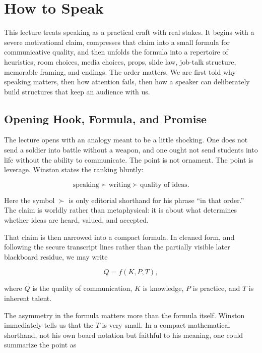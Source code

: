 \chapter{How to Speak}

This lecture treats speaking as a practical craft with real stakes. It begins with a severe motivational claim, compresses that claim into a small formula for communicative quality, and then unfolds the formula into a repertoire of heuristics, room choices, media choices, props, slide law, job-talk structure, memorable framing, and endings. The order matters. We are first told why speaking matters, then how attention fails, then how a speaker can deliberately build structures that keep an audience with us.

\section{Opening Hook, Formula, and Promise}

The lecture opens with an analogy meant to be a little shocking. One does not send a soldier into battle without a weapon, and one ought not send students into life without the ability to communicate. The point is not ornament. The point is leverage. Winston states the ranking bluntly:

\begin{equation}
\text{speaking} \succ \text{writing} \succ \text{quality of ideas}.
\end{equation}

Here the symbol \(\succ\) is only editorial shorthand for his phrase ``in that order.'' The claim is worldly rather than metaphysical: it is about what determines whether ideas are heard, valued, and accepted.

That claim is then narrowed into a compact formula. In cleaned form, and following the secure transcript lines rather than the partially visible later blackboard residue, we may write

\begin{equation}
Q = f(K,P,T),
\end{equation}

where \(Q\) is the quality of communication, \(K\) is knowledge, \(P\) is practice, and \(T\) is inherent talent.

The asymmetry in the formula matters more than the formula itself. Winston immediately tells us that the \(T\) is very small. In a compact mathematical shorthand, not his own board notation but faithful to his meaning, one could summarize the point as

